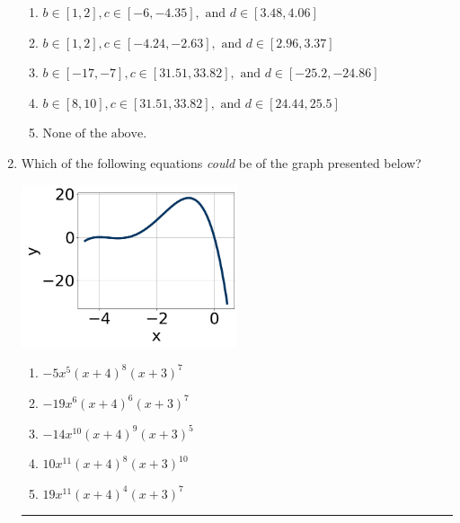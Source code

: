 \documentclass[14pt]{extbook}
\newcommand{\litem}[1]{\item#1\hspace*{-1cm}\rule{\textwidth}{0.4pt}}
\begin{document}
\begin{enumerate}
{\begin{enumerate}[label=\Alph*.]
\item \( b \in [1, 2], c \in [-6, -4.35], \text{ and } d \in [3.48, 4.06] \)
\item \( b \in [1, 2], c \in [-4.24, -2.63], \text{ and } d \in [2.96, 3.37] \)
\item \( b \in [-17, -7], c \in [31.51, 33.82], \text{ and } d \in [-25.2, -24.86] \)
\item \( b \in [8, 10], c \in [31.51, 33.82], \text{ and } d \in [24.44, 25.5] \)
\item \( \text{None of the above.} \)

\end{enumerate} }
\litem{
Which of the following equations \textit{could} be of the graph presented below?
\begin{center}
    \includegraphics[width=0.5\textwidth]{../Figures/polyGraphToFunctionCopyA.png}
\end{center}
\begin{enumerate}[label=\Alph*.]
\item \( -5x^{5} (x + 4)^{8} (x + 3)^{7} \)
\item \( -19x^{6} (x + 4)^{6} (x + 3)^{7} \)
\item \( -14x^{10} (x + 4)^{9} (x + 3)^{5} \)
\item \( 10x^{11} (x + 4)^{8} (x + 3)^{10} \)
\item \( 19x^{11} (x + 4)^{4} (x + 3)^{7} \)


\end{enumerate}}
\end{enumerate}
\end{document}
